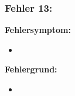 \subsubsection{Fehler 13:}%
\textbf{Fehlersymptom:}
	\begin{itemize}
		\item 
	\end{itemize}
\textbf{Fehlergrund:}
	\begin{itemize}
		\item 
	\end{itemize}
